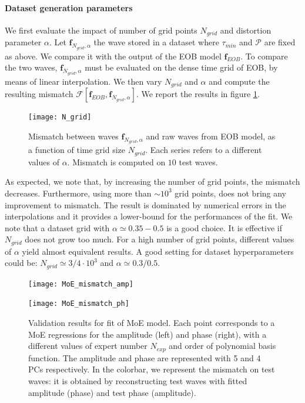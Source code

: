 \paragraph{Dataset generation parameters}
We first evaluate the impact of number of grid points $N_{grid}$ and distortion parameter $\alpha$.
Let $\mathbf{f}_{N_{grid}, \alpha}$ the wave stored in a dataset where $\tau_{min}$ and $\mathcal{P}$ are fixed as above. We compare it with the output of the EOB model $\mathbf{f}_{EOB}$.
To compare the two waves, $\mathbf{f}_{N_{grid}, \alpha}$ must be evaluated on the dense time grid of EOB, by means of linear interpolation.
We then vary $N_{grid}$ and $\alpha$ and compute the resulting mismatch $\mathcal{F}[\mathbf{f}_{EOB}, \mathbf{f}_{N_{grid}, \alpha}]$.
We report the results in figure \ref{fig:N_grid}.
\begin{figure}[!t]
	\centering
	\texttt{[image: N\_grid]}
	\caption{Mismatch between waves $\mathbf{f}_{N_{grid}, \alpha}$ and raw waves from EOB model, as a function of time grid size $N_{grid}$. Each series refers to a different values of $\alpha$.
Mismatch is computed on $10$ test waves.
}
	\label{fig:N_grid}
\end{figure}
\par
As expected, we note that, by increasing the number of grid points, the mismatch decreases. Furthermore, using more than $\sim 10^3$ grid points, does not bring any improvement to mismatch. The result is dominated by numerical errors in the interpolations and it provides a lower-bound for the performances of the fit.
We note that a dataset grid with $\alpha\simeq 	0.35-0.5$ is a good choice.
It is effective if $N_{grid}$ does not grow too much. For a high number of grid points, different values of $\alpha$ yield almost equivalent results.
A good setting for dataset hyperparameters could be: $N_{grid} \simeq 3/4 \cdot 10^{3}$ and $\alpha \simeq 0.3/0.5$.
\begin{figure}[!t]
	\centering
    \begin{minipage}{.5\linewidth}
        \centering
        \texttt{[image: MoE\_mismatch\_amp]}
    \end{minipage}\hfill
    \begin{minipage}{.5\linewidth}
        \centering
        \texttt{[image: MoE\_mismatch\_ph]}
    \end{minipage}
	\caption{Validation results for fit of MoE model. Each point corresponds to a MoE regressions for the amplitude (left) and phase (right), with a different values of expert number $N_{exp}$ and order of polynomial basis function.
The amplitude and phase are represented with 5 and 4 PCs respectively.
In the colorbar, we represent the mismatch on test waves: it is obtained by reconstructing test waves with fitted amplitude (phase) and test phase (amplitude).
}
	\label{fig:MoE_test}
\end{figure}


